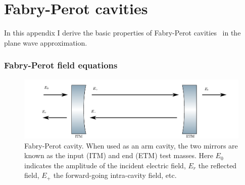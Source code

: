 \chapter{Fabry-Perot cavities}
\label{sec:cavities}
In this appendix I derive the basic properties of Fabry-Perot
cavities~\cite{Fabry1892Theorie,Fabry1901New} in the plane wave approximation.

\cite{Butler2004Characterization}
\subsection{Fabry-Perot field equations}

\begin{figure}
\includegraphics[]{figures/cavity.pdf}
\caption[Fabry-Perot Cavity]{\label{fig:fabry-perot}Fabry-Perot
  cavity.  When used as an arm cavity, the two mirrors are known as
  the input (ITM) and end (ETM) test masses.  Here $E_0$ indicates the
  amplitude of the incident electric field, $E_r$ the reflected field,
  $E_+$ the forward-going intra-cavity field, etc.}
\end{figure}

